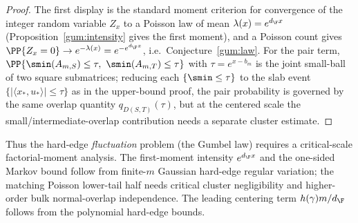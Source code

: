 \begin{proof}
The first display is the standard moment criterion for convergence of the integer
random variable $Z_x$ to a Poisson law of mean $\lambda(x)=e^{d_\F x}$
(Proposition~\ref{gum:intensity} gives the first moment), and a Poisson count gives
$\PP\{Z_x=0\}\to e^{-\lambda(x)}=e^{-e^{d_\F x}}$, i.e.\ Conjecture~\ref{gum:law}.
For the pair term, $\PP\{\smin(A_{m,S})\le\tau,\ \smin(A_{m,T})\le\tau\}$ with
$\tau=e^{x-b_m}$ is the joint small-ball of two square submatrices; reducing each
$\{\smin\le\tau\}$ to the slab event $\{|\langle x_\ast,u_\ast\rangle|\le\tau\}$ as in
the upper-bound proof, the pair probability is governed by the same overlap
quantity $q_{D(S,T)}(\tau)$, but at the centered scale the
small/intermediate-overlap contribution needs a separate cluster estimate.
\end{proof}

\begin{remark}
Thus the hard-edge \emph{fluctuation} problem (the Gumbel law) requires a
critical-scale factorial-moment analysis.  The first-moment intensity
$e^{d_\F x}$ and the one-sided Markov bound follow from finite-$m$ Gaussian
hard-edge regular variation; the matching Poisson lower-tail half needs
critical cluster negligibility and higher-order bulk normal-overlap
independence.  The leading centering term $h(\gamma)m/d_\F$ follows from the
polynomial hard-edge bounds.
\end{remark}
